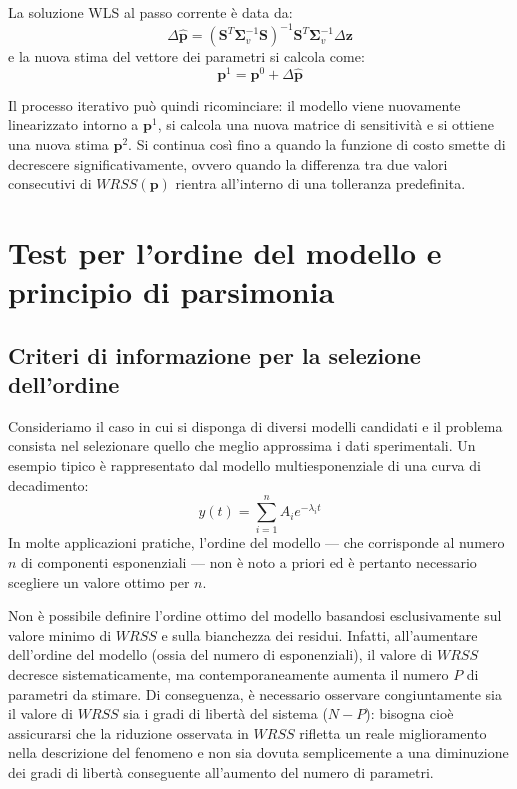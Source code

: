 La soluzione WLS al passo corrente è data da:
\begin{equation}
\Delta\hat{\mathbf{p}} = (\mathbf{S}^{T}\mathbf{\Sigma}_{v}^{-1}\mathbf{S})^{-1}\mathbf{S}^{T}\mathbf{\Sigma}_{v}^{-1}\Delta\mathbf{z}
\end{equation}
e la nuova stima del vettore dei parametri si calcola come:
\begin{equation}
\mathbf{p}^{1} = \mathbf{p}^{0} + \Delta\hat{\mathbf{p}}
\end{equation}

Il processo iterativo può quindi ricominciare: il modello viene nuovamente linearizzato intorno a $\mathbf{p}^{1}$, si calcola una nuova matrice di sensitività e si ottiene una nuova stima $\mathbf{p}^{2}$. Si continua così fino a quando la funzione di costo smette di decrescere significativamente, ovvero quando la differenza tra due valori consecutivi di $WRSS(\mathbf{p})$ rientra all'interno di una tolleranza predefinita.

\section{Test per l'ordine del modello e principio di parsimonia}

\subsection{Criteri di informazione per la selezione dell'ordine}

Consideriamo il caso in cui si disponga di diversi modelli candidati e il problema consista nel selezionare quello che meglio approssima i dati sperimentali. Un esempio tipico è rappresentato dal modello multiesponenziale di una curva di decadimento:
\begin{equation}
y(t) = \sum_{i=1}^{n} A_{i} e^{-\lambda_{i} t}
\end{equation}
In molte applicazioni pratiche, l'ordine del modello --- che corrisponde al numero $n$ di componenti esponenziali --- non è noto a priori ed è pertanto necessario scegliere un valore ottimo per $n$.

Non è possibile definire l'ordine ottimo del modello basandosi esclusivamente sul valore minimo di $WRSS$ e sulla bianchezza dei residui. Infatti, all'aumentare dell'ordine del modello (ossia del numero di esponenziali), il valore di $WRSS$ decresce sistematicamente, ma contemporaneamente aumenta il numero $P$ di parametri da stimare. Di conseguenza, è necessario osservare congiuntamente sia il valore di $WRSS$ sia i gradi di libertà del sistema ($N - P$): bisogna cioè assicurarsi che la riduzione osservata in $WRSS$ rifletta un reale miglioramento nella descrizione del fenomeno e non sia dovuta semplicemente a una diminuzione dei gradi di libertà conseguente all'aumento del numero di parametri.

